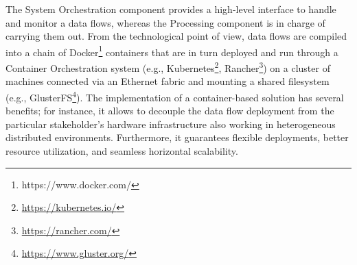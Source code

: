 The System Orchestration component provides a high-level interface to handle and monitor a data flows, whereas the Processing component is in charge of carrying them out. From the technological point of view, data flows are compiled into a chain of Docker\footnote{https://www.docker.com/} containers that are in turn deployed and run through a Container Orchestration system (e.g., Kubernetes\footnote{\url{https://kubernetes.io/}}, Rancher\footnote{\url{https://rancher.com/}}) on a cluster of machines connected via an Ethernet fabric and mounting a shared filesystem (e.g., GlusterFS\footnote{\url{https://www.gluster.org/}}).
The implementation of a container-based solution has several benefits; for instance, it allows to decouple the data flow deployment from the particular stakeholder's hardware infrastructure also working in heterogeneous distributed environments. Furthermore, it guarantees flexible deployments, better resource utilization, and seamless horizontal scalability.  

